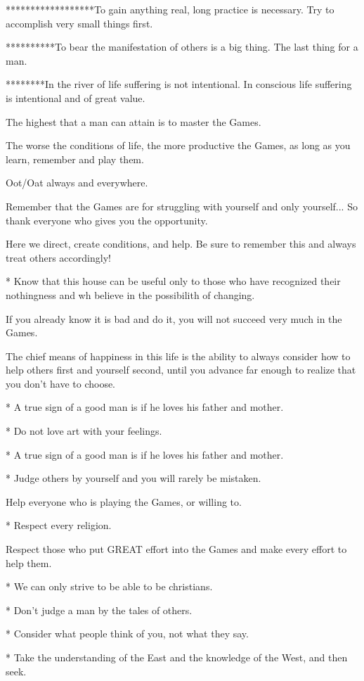\documentclass[12pt,letterpaper]{book}
\begin{document}
******************To gain anything real, long practice is necessary. Try to accomplish very small things first.

**********To bear the manifestation of others is a big thing. The last thing for a man.

********In the river of life suffering is not intentional. In conscious life suffering is intentional and of great value. 

The highest that a man can attain is to master the Games.

The worse the conditions of life, the more productive the Games, as long as you learn, remember and play them.

Oot/Oat always and everywhere.

Remember that the Games are for struggling with yourself and only yourself... So thank everyone who gives you the opportunity.

Here we direct, create conditions, and help. Be sure to remember this and always treat others accordingly!

* Know that this house can be useful only to those who have recognized their nothingness and wh believe in the possibilith of changing.

If you already know it is bad and do it, you will not succeed very much in the Games.

The chief means of happiness in this life is the ability to always consider how to help others first and yourself second, until you advance far enough to realize that you don't have to choose.

* A true sign of a good man is if he loves his father and mother.

* Do not love art with your feelings.

* A true sign of a good man is if he loves his father and mother.

* Judge others by yourself and you will rarely be mistaken.

Help everyone who is playing the Games, or willing to.

* Respect every religion.

Respect those who put GREAT effort into the Games and make every effort to help them.

* We can only strive to be able to be christians.

* Don't judge a man by the tales of others.

* Consider what people think of you, not what they say.

* Take the understanding of the East and the knowledge of the West, and then seek.
\end{document}
